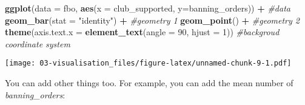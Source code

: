 \documentclass[
]{book}
\newenvironment{Shaded}{\begin{snugshade}}{\end{snugshade}}
\newcommand{\AttributeTok}[1]{\textcolor[rgb]{0.13,0.29,0.53}{#1}}
\newcommand{\CommentTok}[1]{\textcolor[rgb]{0.56,0.35,0.01}{\textit{#1}}}
\newcommand{\DecValTok}[1]{\textcolor[rgb]{0.00,0.00,0.81}{#1}}
\newcommand{\FunctionTok}[1]{\textcolor[rgb]{0.13,0.29,0.53}{\textbf{#1}}}
\newcommand{\NormalTok}[1]{#1}
\newcommand{\SpecialCharTok}[1]{\textcolor[rgb]{0.81,0.36,0.00}{\textbf{#1}}}
\newcommand{\StringTok}[1]{\textcolor[rgb]{0.31,0.60,0.02}{#1}}
\begin{document}
\begin{Shaded}
\begin{Highlighting}[]
\FunctionTok{ggplot}\NormalTok{(}\AttributeTok{data =}\NormalTok{ fbo, }\FunctionTok{aes}\NormalTok{(}\AttributeTok{x =}\NormalTok{ club\_supported, }\AttributeTok{y=}\NormalTok{banning\_orders)) }\SpecialCharTok{+} \CommentTok{\#data}
  \FunctionTok{geom\_bar}\NormalTok{(}\AttributeTok{stat =} \StringTok{"identity"}\NormalTok{) }\SpecialCharTok{+}                                 \CommentTok{\#geometry 1 }
  \FunctionTok{geom\_point}\NormalTok{() }\SpecialCharTok{+}                                                \CommentTok{\#geometry 2}
  \FunctionTok{theme}\NormalTok{(}\AttributeTok{axis.text.x =} \FunctionTok{element\_text}\NormalTok{(}\AttributeTok{angle =} \DecValTok{90}\NormalTok{, }\AttributeTok{hjust =} \DecValTok{1}\NormalTok{))      }\CommentTok{\#backgroud coordinate system}
\end{Highlighting}
\end{Shaded}

\texttt{[image: 03-visualisation\_files/figure-latex/unnamed-chunk-9-1.pdf]}

You can add other things too. For example, you can add the mean number of \emph{banning\_orders}:

\begin{Shaded}
\end{Shaded}
\end{document}
